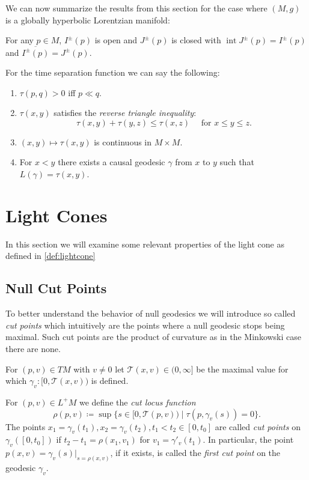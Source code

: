 \begin{remark}\label{rmk:causalitysummary}
We can now summarize the results from this section for the case where $(M,g)$ is a globally hyperbolic Lorentzian manifold:

For any $p\in M$, $I^\pm(p)$ is open and $J^\pm(p)$ is closed with $\operatorname{int} J^\pm(p) = I^\pm(p)$ and $\overline{I^\pm(p)}=J^\pm(p)$.

For the time separation function we can say the following:
\begin{enumerate}[label={\textnormal{(\arabic*)}}]
    \item $\tau(p,q)>0$ iff $p\ll q$.
    \item $\tau(x,y)$ satisfies the \emph{reverse triangle inequality}:
    \[
    \tau(x,y) + \tau(y,z) \leq \tau(x,z) \quad \text{ for }x\leq y\leq z.
    \]
    \item $(x,y)\mapsto \tau(x,y)$ is continuous in $M\times M$.
    \item For $x<y$ there exists a causal geodesic $\gamma$ from $x$ to $y$ such that $L(\gamma)=\tau(x,y)$.
\end{enumerate}

\end{remark}


\section{Light Cones}

In this section we will examine some relevant properties of the light cone as defined in \ref{def:lightcone}

\subsection{Null Cut Points}
To better understand the behavior of null geodesics we will introduce so called \emph{cut points} which intuitively are the points where a null geodesic stops being maximal. Such cut points are the product of curvature as in the Minkowski case there are none.

For $(p,v)\in TM$ with $v\neq 0$ let $\mathcal{T}(x,v)\in(0,\infty]$ be the maximal value for which $\gamma_v:[0,\mathcal{T}(x,v))$ is defined.

\begin{definition}\label{def:cutpoint}
For $(p,v)\in L^+M$ we define the \emph{cut locus function}
\[
\rho(p,v)\coloneqq\sup\{s\in[0,\mathcal{T}(p,v)) \mid \tau(p,\gamma_v(s))=0\}.
\]
The points $x_1=\gamma_v(t_1), x_2=\gamma_v(t_2), t_1<t_2 \in [0,t_0]$ are called \emph{cut points} on $\gamma_v([0,t_0])$ if $t_2-t_1 = \rho(x_1,v_1)$ for $v_1 = \gamma'_v(t_1)$. In particular, the point $p(x,v) = \gamma_v(s)\rvert_{s=\rho(x,v)}$, if it exists, is called the \emph{first cut point} on the geodesic $\gamma_v$.
\end{definition}

